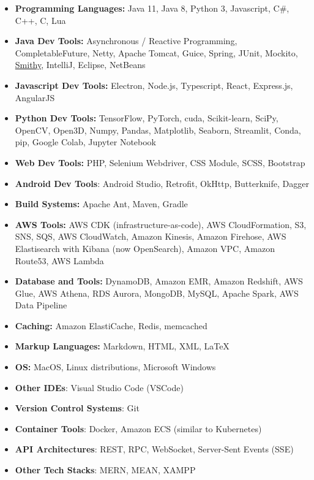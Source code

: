\newcommand{\Smithy}{\href{https://smithy.io/}{Smithy}}
\begin{itemize}[label={}, leftmargin=0in]
   \setlength\itemsep{0em}
   \item \textbf{Programming Languages:} Java 11, Java 8, Python 3, Javascript, C\#, C++, C, Lua
   \item \textbf{Java Dev Tools:} Asynchronous / Reactive Programming, CompletableFuture, Netty, Apache Tomcat, Guice, Spring, JUnit, Mockito, \Smithy, IntelliJ, Eclipse, NetBeans
   \item \textbf{Javascript Dev Tools:} Electron, Node.js, Typescript, React, Express.js, AngularJS
   \item \textbf{Python Dev Tools:} TensorFlow, PyTorch, cuda, Scikit-learn, SciPy, OpenCV, Open3D, Numpy, Pandas, Matplotlib, Seaborn, Streamlit, Conda, pip, Google Colab, Jupyter Notebook
   \item \textbf{Web Dev Tools:} PHP, Selenium Webdriver, CSS Module, SCSS, Bootstrap
   \item \textbf{Android Dev Tools}: Android Studio, Retrofit, OkHttp, Butterknife, Dagger
   \item \textbf{Build Systems:} Apache Ant, Maven, Gradle
   \item \textbf{AWS Tools:} AWS CDK (infrastructure-as-code), AWS CloudFormation, S3, SNS, SQS, AWS CloudWatch, Amazon Kinesis, Amazon Firehose, AWS Elastisearch with Kibana (now OpenSearch), Amazon VPC, Amazon Route53, AWS Lambda
   \item \textbf{Database and Tools:} DynamoDB, Amazon EMR, Amazon Redshift, AWS Glue, AWS Athena, RDS Aurora, MongoDB, MySQL, Apache Spark, AWS Data Pipeline
   \item \textbf{Caching:} Amazon ElastiCache, Redis, memcached
   \item \textbf{Markup Languages:} Markdown, HTML, XML, \LaTeX
   \item \textbf{OS:} MacOS, Linux distributions, Microsoft Windows
   \item \textbf{Other IDEs}: Visual Studio Code (VSCode)
   \item \textbf{Version Control Systems}: Git
   \item \textbf{Container Tools}: Docker, Amazon ECS (similar to Kubernetes)
   \item \textbf{API Architectures}: REST, RPC, WebSocket, Server-Sent Events (SSE)
   \item \textbf{Other Tech Stacks}: MERN, MEAN, XAMPP
\end{itemize}
